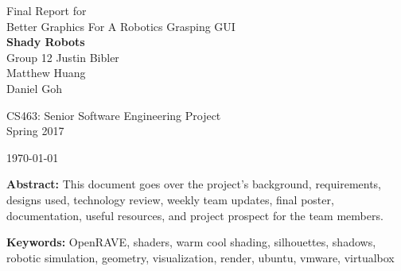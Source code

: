 \documentclass[10pt,journal,compsoc,draftclsnofoot]{IEEEtran}
\begin{document}
\onecolumn

\begin{titlepage}
\null
\vspace{15mm}

\begin{flushleft}
\begin{bfseries}
	\vskip2mm
	\Huge{Final Report for\\ Better Graphics For A Robotics Grasping GUI}\\
	\vspace{15mm}
	\textbf{\huge Shady Robots} \\
	\vskip2mm
	\large{Group 12}
	\vskip5mm
	\Large{Justin Bibler \\
	Matthew Huang \\
	Daniel Goh \\}
\end{bfseries}

\vspace{15mm}
\Large{CS463: Senior Software Engineering Project} \\
\Large{Spring 2017} \\

\vspace{5mm}

\today

\vfill

\begin{normalsize}
{\bf Abstract:}
This document goes over the project's background, requirements, designs used, technology review, weekly team updates, final poster, documentation, useful resources, and project prospect for the team members.

{\bf Keywords:} OpenRAVE, shaders, warm cool shading, silhouettes, shadows, robotic simulation, geometry, visualization, render, ubuntu, vmware, virtualbox
\end{normalsize}
\end{flushleft}

\newpage

\end{titlepage}
\end{document}
